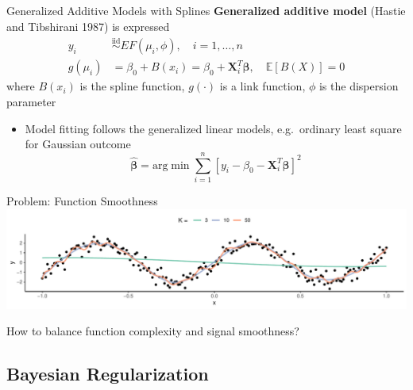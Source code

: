 \documentclass[
  ignorenonframetext,
  aspectratio=169]{beamer}
\providecommand{\tightlist}{%
  \setlength{\itemsep}{0pt}\setlength{\parskip}{0pt}}
\newcommand{\bs}[1]{\boldsymbol{#1}}
\newcommand{\simiid}{\overset{\text{iid}}{\sim}}
\begin{document}
\begin{frame}{Generalized Additive Models with Splines}
\protect\hypertarget{generalized-additive-models-with-splines}{}
\textbf{Generalized additive model} (Hastie and Tibshirani 1987) is
expressed \begin{align*}
  y_i &\simiid EF(\mu_i, \phi), \quad i = 1, \dots, n\\
  g(\mu_i) &= \beta_0 + B(x_i) = \beta_0 + \bs X_i^T \bs \beta ,  \quad \mathbb{E}\left[B(X)\right] = 0 
\end{align*} where \(B(x_i)\) is the spline function, \(g(\cdot)\) is a
link function, \(\phi\) is the dispersion parameter

\vspace*{0.2cm}

\begin{itemize}
\tightlist
\item
  Model fitting follows the generalized linear models, e.g.~ordinary
  least square for Gaussian outcome \[
  \boldsymbol{\hat \beta} = \text{arg}\min \sum\limits^n_{i=1} \left[y_i - \beta_0 - \bs X_i^T \bs \beta \right]^2
  \]
\end{itemize}
\end{frame}

\begin{frame}{Problem: Function Smoothness}
\protect\hypertarget{problem-function-smoothness}{}
\includegraphics{phd_defense_slides_files/figure-beamer/spline_overfitting-1.pdf}

\begin{tcolorbox}[colback=green!5,colframe=green!40!black,title=Question]
How to balance function complexity and signal smoothness?
\end{tcolorbox}
\end{frame}

\hypertarget{bayesian-regularization}{%
\subsection{Bayesian Regularization}\label{bayesian-regularization}}
\end{document}
